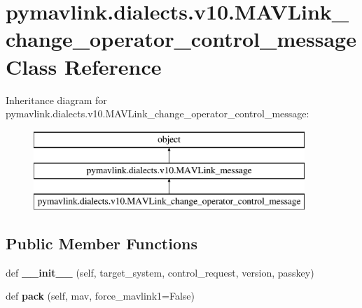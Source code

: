 \hypertarget{classpymavlink_1_1dialects_1_1v10_1_1MAVLink__change__operator__control__message}{}\section{pymavlink.\+dialects.\+v10.\+M\+A\+V\+Link\+\_\+change\+\_\+operator\+\_\+control\+\_\+message Class Reference}
\label{classpymavlink_1_1dialects_1_1v10_1_1MAVLink__change__operator__control__message}
Inheritance diagram for pymavlink.\+dialects.\+v10.\+M\+A\+V\+Link\+\_\+change\+\_\+operator\+\_\+control\+\_\+message\+:\begin{figure}[H]
\begin{center}
\leavevmode
\includegraphics[height=3.000000cm]{classpymavlink_1_1dialects_1_1v10_1_1MAVLink__change__operator__control__message}
\end{center}
\end{figure}
\subsection*{Public Member Functions}
\begin{DoxyCompactItemize}
\item 
\mbox{\label{classpymavlink_1_1dialects_1_1v10_1_1MAVLink__change__operator__control__message_a6de46a23cb508e5de322f416f684bba5}} 
def {\bfseries \+\_\+\+\_\+init\+\_\+\+\_\+} (self, target\+\_\+system, control\+\_\+request, version, passkey)
\item 
\mbox{\label{classpymavlink_1_1dialects_1_1v10_1_1MAVLink__change__operator__control__message_ac7fa44efbca6cc91de290dcfd9aba3d1}} 
def {\bfseries pack} (self, mav, force\+\_\+mavlink1=False)
\end{DoxyCompactItemize}
